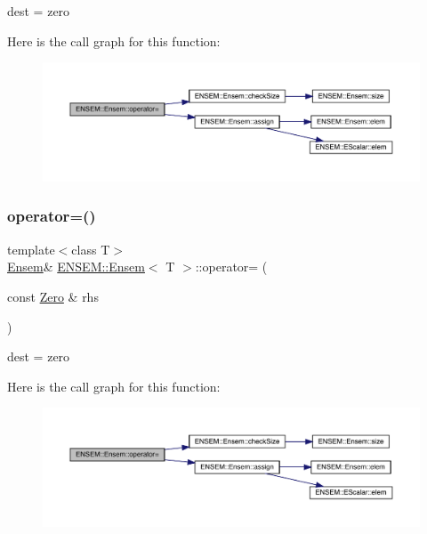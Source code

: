 dest = zero 

Here is the call graph for this function\+:
\nopagebreak
\begin{figure}[H]
\begin{center}
\leavevmode
\includegraphics[width=350pt]{d7/d3e/classENSEM_1_1Ensem_a55913bc59bca1022f5189cbc86632c11_cgraph}
\end{center}
\end{figure}
\mbox{\label{classENSEM_1_1Ensem_a55913bc59bca1022f5189cbc86632c11}} 
\subsubsection{\texorpdfstring{operator=()}{operator=()}\hspace{0.1cm}{\footnotesize\ttfamily [5/15]}}
{\footnotesize\ttfamily template$<$class T$>$ \\
\mbox{\hyperlink{classENSEM_1_1Ensem}{Ensem}}\& \mbox{\hyperlink{classENSEM_1_1Ensem}{E\+N\+S\+E\+M\+::\+Ensem}}$<$ T $>$\+::operator= (\begin{DoxyParamCaption}\item[{const \mbox{\hyperlink{structENSEM_1_1Zero}{Zero}} \&}]{rhs }\end{DoxyParamCaption})\hspace{0.3cm}{\ttfamily [inline]}}



dest = zero 

Here is the call graph for this function\+:
\nopagebreak
\begin{figure}[H]
\begin{center}
\leavevmode
\includegraphics[width=350pt]{d7/d3e/classENSEM_1_1Ensem_a55913bc59bca1022f5189cbc86632c11_cgraph}
\end{center}
\end{figure}
\mbox{\label{classENSEM_1_1Ensem_a55913bc59bca1022f5189cbc86632c11}} 
